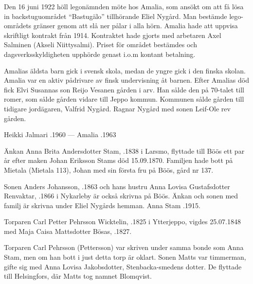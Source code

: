 Den 16 juni 1922 höll legonämnden möte hos Amalia, som ansökt om att få lösa in backstuguområdet ``Bastugälo'' tillhörande Eliel Nygård. Man bestämde lego-områdets gränser genom att slå ner pålar i alla hörn. Amalia hade att uppvisa skriftligt kontrakt från 1914. Kontraktet hade gjorts med arbetaren Axel Salminen (Akseli Niittysalmi). Priset för området bestämdes och dagsverksskyldigheten upphörde genast i.o.m kontant betalning.

Amalias äldsta barn gick i svensk skola, medan de yngre gick i den finska skolan. Amalia var en aktiv pådrivare av finsk undervisning åt barnen. Efter Amalias död fick Elvi Susannas son Reijo Vesanen gården i arv. Han sålde den på 70-talet till romer, som sålde gården vidare till Jeppo kommun. Kommunen sålde gården till tidigare jordägaren, Valfrid Nygård. Ragnar Nygård med sonen Leif-Ole rev gården.

Heikki Jalmari .1960  ---  Amalia .1963


%
Änkan Anna Brita Andersdotter Stam, .1838 i Larsmo, flyttade till Böös ett par år efter maken Johan Eriksson Stams död 15.09.1870. Familjen hade bott på Mietala (Mietala 113), Johan med sin första fru på Böös, gård nr 137.

Sonen Anders Johansson, .1863 och hans hustru Anna Lovisa Gustafsdotter Renvaktar, .1866 i Nykarleby är också skrivna på Böös. Änkan och sonen med familj är skrivna under Eliel Nygårds hemman. Anna Stam .1915.


%
Torparen Carl Petter Pehrsson Wicktelin, .1825 i Ytterjeppo, vigdes 25.07.1848 med Maja Caisa Mattsdotter Bösas, .1827.
\begin{jhchildren}
  \item {}
  \item {}
  \item {}
  \item {}
  \item {}
  \item {}
\end{jhchildren}
Torparen Carl Pehrsson (Pettersson) var skriven under samma bonde som Anna Stam, men om han bott i just detta torp är oklart. Sonen Matts var timmerman, gifte sig med Anna Lovisa Jakobsdotter, Stenbacka-smedens dotter. De flyttade till Helsingfors, där Matts tog namnet Blomqvist.



